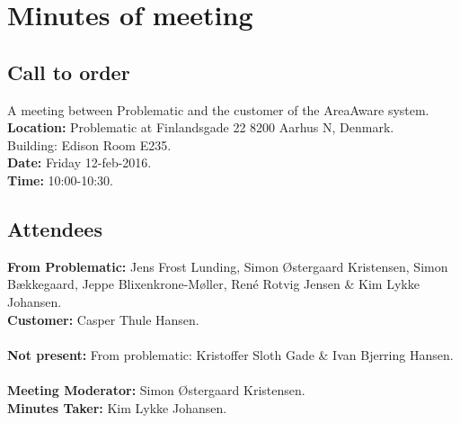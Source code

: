 %
\thispagestyle{fancy}
\chapter*{Minutes of meeting}

\section*{Call to order}
A meeting between Problematic and the customer of the AreaAware system.
\textbf{Location:} Problematic at Finlandsgade 22 8200 Aarhus N, Denmark.\\ Building: Edison Room E235.\\
\textbf{Date:} Friday 12-feb-2016. \\
\textbf{Time:} 10:00-10:30.


\section*{Attendees}
\textbf{From Problematic:} Jens Frost Lunding, Simon Østergaard Kristensen, Simon Bækkegaard, Jeppe Blixenkrone-Møller, René Rotvig Jensen \& Kim Lykke Johansen.\\
\textbf{Customer:} Casper Thule Hansen.\\\\
\textbf{Not present:} From problematic: Kristoffer Sloth Gade \& Ivan Bjerring Hansen.\\\\
\textbf{Meeting Moderator:} Simon Østergaard Kristensen.\\
\textbf{Minutes Taker:} Kim Lykke Johansen.

